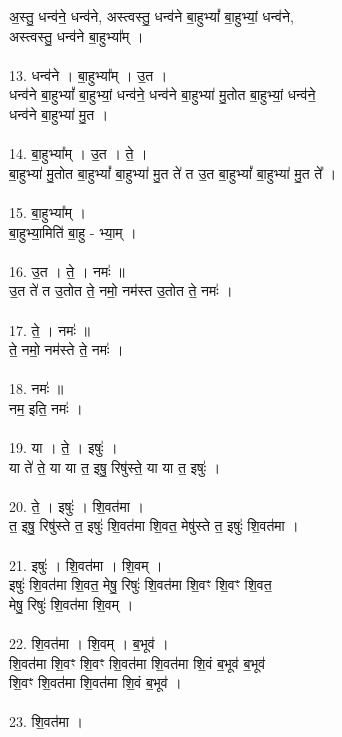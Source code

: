 अ॒स्तु॒ धन्व॑ने॒ धन्व॑ने, अस्त्वस्तु॒ धन्व॑ने बा॒हुभ्यां᳚ बा॒हुभ्यां॒ धन्व॑ने,\\
अस्त्वस्तु॒ धन्व॑ने बा॒हुभ्या᳚म् ।\\
\\
13. धन्व॑ने । बा॒हुभ्या᳚म् । उ॒त ।\\
धन्व॑ने बा॒हुभ्यां᳚ बा॒हुभ्यां॒ धन्व॑ने॒ धन्व॑ने बा॒हुभ्या॑ मु॒तोत बा॒हुभ्यां॒ धन्व॑ने॒\\
धन्व॑ने बा॒हुभ्या॑ मु॒त ।\\
\\
14. बा॒हुभ्या᳚म् । उ॒त । ते॒ ।\\
बा॒हुभ्या॑ मु॒तोत बा॒हुभ्यां᳚ बा॒हुभ्या॑ मु॒त ते॑ त उ॒त बा॒हुभ्यां᳚ बा॒हुभ्या॑ मु॒त ते᳚ ।\\
\\
15. बा॒हुभ्या᳚म् ।\\
बा॒हुभ्या॒मिति॑ बा॒हु - भ्या॒म् ।\\
\\
16. उ॒त । ते॒ । नमः॑ ॥\\
उ॒त ते॑ त उ॒तोत ते॒ नमो॒ नम॑स्त उ॒तोत ते॒ नमः॑ ।\\
\\
17. ते॒ । नमः॑ ॥\\
ते॒ नमो॒ नम॑स्ते ते॒ नमः॑ ।\\
\\
18. नमः॑ ॥\\
नम॒ इति॒ नमः॑ ।\\
\\
19. या । ते॒ । इषुः॑ । \\
या ते॑ ते॒ या या त॒ इषु॒ रिषु॑स्ते॒ या या त॒ इषुः॑ ।\\
\\
20. ते॒ । इषुः॑ । शि॒वत॑मा ।\\
त॒ इषु॒ रिषु॑स्ते त॒ इषुः॑ शि॒वत॑मा शि॒वत॒ मेषु॑स्ते त॒ इषुः॑ शि॒वत॑मा ।\\
\\
21. इषुः॑ । शि॒वत॑मा । शि॒वम् ।\\
इषुः॑ शि॒वत॑मा शि॒वत॒ मेषु॒ रिषुः॑ शि॒वत॑मा शि॒वꣳ शि॒वꣳ शि॒वत॒\\
मेषु॒ रिषुः॑ शि॒वत॑मा शि॒वम् ।\\
\\
22. शि॒वत॑मा । शि॒वम् । ब॒भूव॑ ।\\
शि॒वत॑मा शि॒वꣳ शि॒वꣳ शि॒वत॑मा शि॒वत॑मा शि॒वं ब॒भूव॑ ब॒भूव॑\\
शि॒वꣳ शि॒वत॑मा शि॒वत॑मा शि॒वं ब॒भूव॑ ।\\
\\
23. शि॒वत॑मा ।\\
